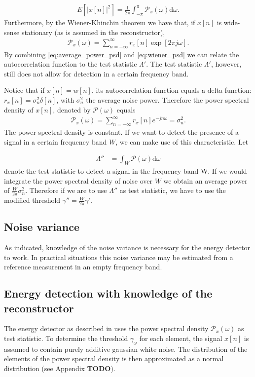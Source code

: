 \documentclass[a4paper, openany, oneside]{memoir}
\begin{document}
\begin{align}\label{eq:average_power_psd}
E\left[\left|x[n]\right|^2\right] = \frac{1}{2\pi} \int_{-\pi}^{\pi}\mathcal{P}_x(\omega) \text{d}\omega.
\end{align}
Furthermore, by the Wiener-Khinchin theorem we have that, if $x[n]$ is wide-sense stationary (as is assumed in the reconstructor),
\begin{align}\label{eq:wiener_psd}
	\mathcal{P}_x(\omega) = \sum_{n=-\infty}^{\infty} r_x[n] \exp [2\pi j\omega].
\end{align}
By combining \cref{eq:average_power_psd} and \cref{eq:wiener_psd} we can relate the autocorrelation function to the test statistic $\Lambda'$.
The test statistic $\Lambda'$, however, still does not allow for detection in a certain frequency band.

 Notice that if $x[n]=w[n]$, its autocorrelation function equals a delta function: $r_x[n] = \sigma_n^2\delta[n]$, with $\sigma_n^2$ the average noise power. 
 Therefore the power spectral density of $x[n]$, denoted by $\mathcal{P}(\omega)$ equals  
 \begin{align*}
 \mathcal{P}_x(\omega) = \sum_{n=-\infty}^{\infty}r_x[n]e^{-jn\omega} = \sigma_n^2.
 \end{align*} The power spectral density is constant. If we want to detect the presence of a signal in a certain frequency band $W$, we can make use of this characteristic. Let

 \begin{align*}
 \Lambda'' &= \int_W \mathcal{P}(\omega) \text{d}\omega
 \end{align*}
denote the test statistic to detect a signal in the frequency band W.
 If we would integrate the power spectral density of noise over $W$ we obtain an average power of  $\frac{W}{2\pi} \sigma_n^2$. Therefore if we are to use $\Lambda''$ as test statistic, we have to use the modified threshold $\gamma'' = \frac{W}{2\pi} \gamma'$.

\subsection{Noise variance}
As indicated, knowledge of the noise variance is necessary for the energy detector to work. In practical situations this noise variance may be estimated from a reference measurement in an empty frequency band. 

\subsection{Energy detection with knowledge of the reconstructor}
The energy detector as described in \cite{ariananda2012compressive} uses the power spectral density $\mathcal{P}_x(\omega)$ as test statistic. To determine the threshold $\gamma_{\omega}$ for each element, the signal $x[n]$ is assumed to contain purely additive gaussian white noise. The distribution of the elements of the power spectral density is then approximated as a normal distribution (see Appendix \textbf{TODO}).
\end{document}
